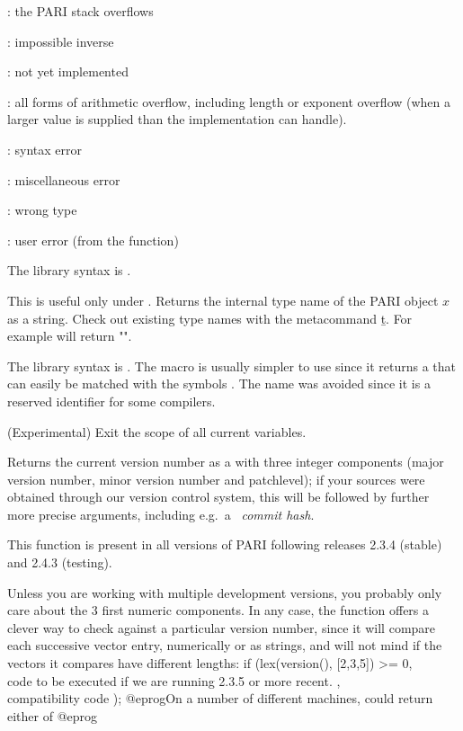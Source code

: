: the PARI stack overflows

: impossible inverse

: not yet implemented

: all forms of arithmetic overflow, including length
or exponent overflow (when a larger value is supplied than the
implementation can handle).

: syntax error

: miscellaneous error

: wrong type

: user error (from the  function)

The library syntax is .

\label{se:type}
This is useful only under . Returns the internal type name of
the PARI object $x$ as a  string. Check out existing type names with the
metacommand \b{t}. For example  will return "".

The library syntax is .
The macro  is usually simpler to use since it returns a
 that can easily be matched with the symbols \typ{*}. The name
 was avoided since it is a reserved identifier for some compilers.

\label{se:uninline}
(Experimental) Exit the scope of all current  variables.

\label{se:version}
Returns the current version number as a  with three integer
components (major version number, minor version number and patchlevel);
if your sources were obtained through our version control system, this will
be followed by further more precise arguments, including
e.g.~a~ \emph{commit hash}.

This function is present in all versions of PARI following releases 2.3.4
(stable) and 2.4.3 (testing).

Unless you are working with multiple development versions, you probably only
care about the 3 first numeric components. In any case, the  function
offers a clever way to check against a particular version number, since it will
compare each successive vector entry, numerically or as strings, and will not
mind if the vectors it compares have different lengths:
\bprog
   if (lex(version(), [2,3,5]) >= 0,
     \\ code to be executed if we are running 2.3.5 or more recent.
   ,
     \\ compatibility code
   );
@eprog\noindent On a number of different machines,  could return either of
\bprog
@eprog


